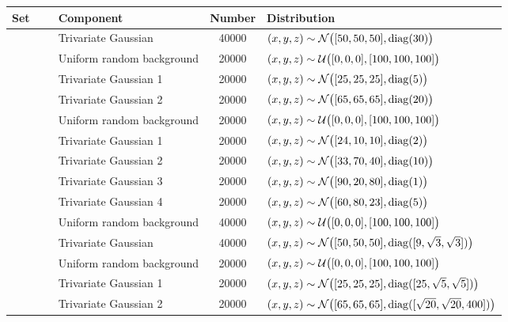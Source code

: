 
\begin{tabular}{@{}cclS[table-format=+1.1e+1,scientific-notation=true,round-mode=places,round-precision=1]l@{}}
\toprule
Set 			&~						& Component					& {Number} 	& Distribution\\
\midrule
\ferdosiOne 	&\legendComponentOne		& Trivariate Gaussian 		& 40000		& $(x, y, z) \sim \mathcal{N}\big([50, 50, 50], \operatorname{diag}(30)\big)$\\
~ 				&\legendComponentNoise	& Uniform random background	& 20000		& $(x, y, z) \sim \mathcal{U}\big([0, 0, 0], [100, 100, 100]\big)$\\
\hline
\ferdosiTwo 	&\legendComponentOne	& Trivariate Gaussian 1		& 20000		& $(x, y, z) \sim \mathcal{N}\big([25, 25, 25], \operatorname{diag}(5)\big)$\\
~ 				&\legendComponentTwo	& Trivariate Gaussian 2		& 20000		& $(x, y, z) \sim \mathcal{N}\big([65, 65, 65], \operatorname{diag}(20)\big)$\\
~ 				&\legendComponentNoise	& Uniform random background	& 20000		& $(x, y, z) \sim \mathcal{U}\big([0, 0, 0], [100, 100, 100]\big)$\\
\hline
\ferdosiThree	&\legendComponentOne 	& Trivariate Gaussian 1 	& 20000		& $(x, y, z) \sim \mathcal{N}\big([24, 10, 10], \operatorname{diag}(2)\big)$\\
~ 				&\legendComponentTwo	& Trivariate Gaussian 2 	& 20000		& $(x, y, z) \sim \mathcal{N}\big([33, 70, 40], \operatorname{diag}(10)\big)$\\
~ 				&\legendComponentThree	& Trivariate Gaussian 3 	& 20000		& $(x, y, z) \sim \mathcal{N}\big([90, 20, 80], \operatorname{diag}(1)\big)$\\
~ 				&\legendComponentFour	& Trivariate Gaussian 4 	& 20000		& $(x, y, z) \sim \mathcal{N}\big([60, 80, 23], \operatorname{diag}(5)\big)$\\
~ 				&\legendComponentNoise	& Uniform random background	& 40000		& $(x, y, z) \sim \mathcal{U}\big([0, 0, 0], [100, 100, 100]\big)$\\
\hline
\baakmanOne		&\legendComponentOne	& Trivariate Gaussian 		& 40000		& $(x, y, z) \sim \mathcal{N}\big([50, 50, 50], \operatorname{diag}([9, \sqrt{3}, \sqrt{3}])\big)$\\
~ 				&\legendComponentNoise	& Uniform random background	& 20000		& $(x, y, z) \sim \mathcal{U}\big([0, 0, 0], [100, 100, 100]\big)$\\
\hline
\baakmanTwo		&\legendComponentOne	& Trivariate Gaussian 1		& 20000		& $(x, y, z) \sim \mathcal{N}\big([25, 25, 25], \operatorname{diag}([25, \sqrt{5}, \sqrt{5}])\big)$\\
~ 				&\legendComponentTwo	& Trivariate Gaussian 2		& 20000		& $(x, y, z) \sim \mathcal{N}\big([65, 65, 65], \operatorname{diag}([\sqrt{20}, \sqrt{20}, 400])\big)$\\

\end{tabular}
